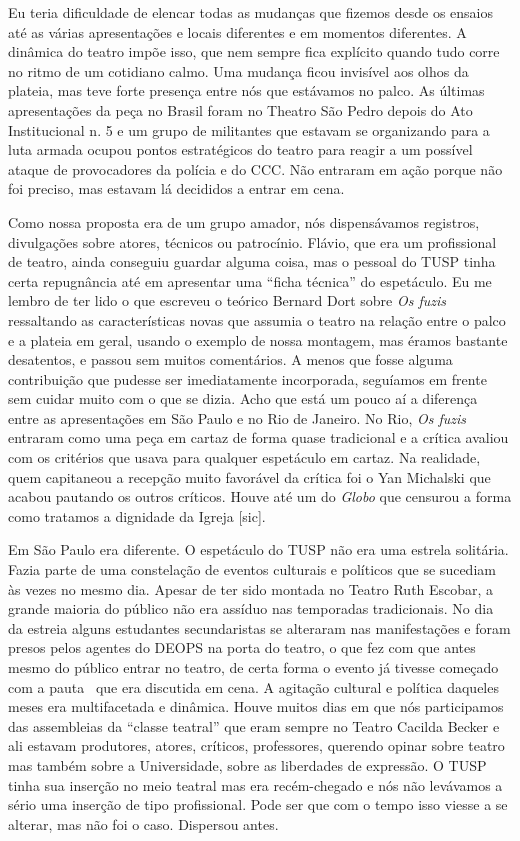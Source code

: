 Eu teria dificuldade de elencar todas as mudanças que fizemos desde os
ensaios até as várias apresentações e locais diferentes e em momentos
diferentes. A dinâmica do teatro impõe isso, que nem sempre fica
explícito quando tudo corre no ritmo de um cotidiano calmo. Uma mudança
ficou invisível aos olhos da plateia, mas teve forte presença entre nós
que estávamos no palco. As últimas apresentações da peça no Brasil foram
no Theatro São Pedro depois do Ato Institucional n. 5 e um grupo de
militantes que estavam se organizando para a luta armada ocupou pontos
estratégicos do teatro para reagir a um possível ataque de provocadores
da polícia e do CCC. Não entraram em ação porque não foi preciso, mas
estavam lá decididos a entrar em cena.

Como nossa proposta era de um grupo amador, nós dispensávamos registros,
divulgações sobre atores, técnicos ou patrocínio. Flávio, que era um
profissional de teatro, ainda conseguiu guardar alguma coisa, mas o
pessoal do TUSP tinha certa repugnância até em apresentar uma “ficha
técnica” do espetáculo. Eu me lembro de ter lido o que escreveu o
teórico Bernard Dort sobre \textit{Os fuzis} ressaltando as características
novas que assumia o teatro na relação entre o palco e a plateia em
geral, usando o exemplo de nossa montagem, mas éramos bastante
desatentos, e passou sem muitos comentários. A menos que fosse alguma
contribuição que pudesse ser imediatamente incorporada, seguíamos em
frente sem cuidar muito com o que se dizia. Acho que está um pouco aí a
diferença entre as apresentações em São Paulo e no Rio de Janeiro. No
Rio, \textit{Os fuzis} entraram como uma peça em cartaz de forma quase
tradicional e a crítica avaliou com os critérios que usava para qualquer
espetáculo em cartaz. Na realidade, quem capitaneou a recepção muito
favorável da crítica foi o Yan Michalski que acabou pautando os outros
críticos. Houve até um do \textit{Globo} que censurou a forma como tratamos
a dignidade da Igreja {[}sic{]}.

Em São Paulo era diferente. O espetáculo do TUSP não era uma estrela
solitária. Fazia parte de uma constelação de eventos culturais e
políticos que se sucediam às vezes no mesmo dia. Apesar de ter sido
montada no Teatro Ruth Escobar, a grande maioria do público não era
assíduo nas temporadas tradicionais. No dia da estreia alguns estudantes
secundaristas se alteraram nas manifestações e foram presos pelos
agentes do DEOPS na porta do teatro, o que fez com que antes mesmo do
público entrar no teatro, de certa forma o evento já tivesse começado
com a pauta ~que era discutida em cena. A agitação cultural e política
daqueles meses era multifacetada e dinâmica. Houve muitos dias em que
nós participamos das assembleias da “classe teatral” que eram sempre no
Teatro Cacilda Becker e ali estavam produtores, atores, críticos,
professores, querendo opinar sobre teatro mas também sobre a
Universidade, sobre as liberdades de expressão. O TUSP tinha sua
inserção no meio teatral mas era recém-chegado e nós não levávamos a
sério uma inserção de tipo profissional. Pode ser que com o tempo isso
viesse a se alterar, mas não foi o caso. Dispersou antes.

